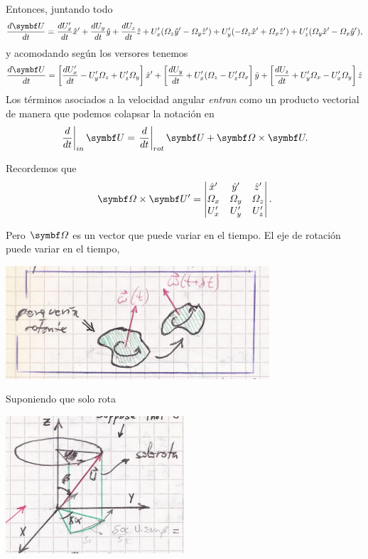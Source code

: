 \documentclass[10pt,oneside]{CBFT_book}
\begin{document}
Entonces, juntando todo 
\[
	\dtot{\vb{U} }{t} = \dtot{U_x'}{t} \hat{x}' + \dtot{U_y}{t}\hat{y} + \dtot{U_z}{t}\hat{z} + 
	U_x' ( \Omega_z \hat{y}' - \Omega_y \hat{z}' ) + U_y'( - \Omega_z \hat{x}' + \Omega_x \hat{z}' ) 
	+ U_z'( \Omega_y \hat{x}' - \Omega_x \hat{y}' ),
\]
y acomodando según los versores tenemos 
\[
	\dtot{\vb{U} }{t} = \left[ \dtot{U_x'}{t} - U_y' \Omega_z + U_z' \Omega_y  \right] \hat{x}' + 
	\left[ \dtot{U_y}{t} + U_x' ( \Omega_z - U_z' \Omega_x \right] \hat{y}  + 
	\left[ \dtot{U_z}{t} + U_y' \Omega_x - U_x' \Omega_y \right] \hat{z} 
\]
Los términos asociados a la velocidad angular {\it entran} como un producto vectorial de manera que podemos 
colapsar la notación en 
\[
	\left.\frac{d}{dt}\right|_{in} \vb{U} = \left.\frac{d}{dt} \right|_{rot} \vb{U} + \vb{\Omega} \times \vb{U}.
\]

Recordemos que 
\[
	\vb{\Omega} \times \vb{U}' = \begin{vmatrix}
	                              \hat{x}' & \hat{y}' & \hat{z}' \\
	                              \Omega_x & \Omega_y  & \Omega_z \\
	                              U_x' & U_y' & U_z' 
	                             \end{vmatrix}.
\]

Pero $\vb{\Omega}$ es un vector que puede variar en el tiempo. El eje de rotación puede variar en el tiempo,

\includegraphics[scale=0.4]{images/fig_mc_rotaciones_porqueria.jpg}

Suponiendo que  solo rota 

\includegraphics[scale=0.4]{images/fig_mc_rotaciones_u_solorota.jpg}
\end{document}
